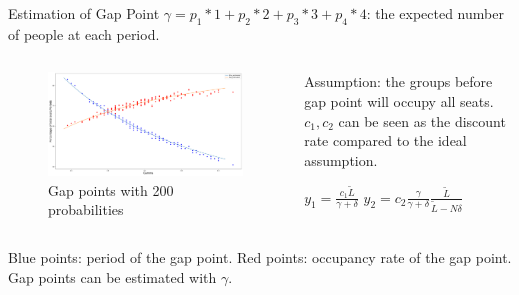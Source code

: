     \begin{frame}{Estimation of Gap Point}
      \scriptsize
      $\gamma = p_1 * 1 + p_2 * 2 + p_3 * 3 + p_4 * 4$: the expected number of people at each period.
      \begin{columns}
        \begin{column}{0.8\textwidth}
      \begin{figure}[ht]
        \centering
        \includegraphics[width = 1\textwidth]{./images/gamma.pdf}
        \caption{Gap points with 200 probabilities}
    \end{figure}
  \end{column}

  \begin{column}{0.2\textwidth}
    Assumption: the groups before gap point will occupy all seats.
    $c_1, c_2$ can be seen as the discount rate compared to the ideal assumption.

    {\color{blue} $y_1 = \frac{c_1 \tilde{L}}{\gamma + \delta}$}
    {\color{red}  $y_2 = c_2 \frac{\gamma}{\gamma + \delta} \frac{\tilde{L}}{\tilde{L}-N \delta}$}
  \end{column}
  \end{columns}

    \scriptsize
    {\color{blue} Blue points}: period of the gap point.
    {\color{red} Red points}: occupancy rate of the gap point. 
    Gap points can be estimated with $\gamma$.
    \end{frame}




    

